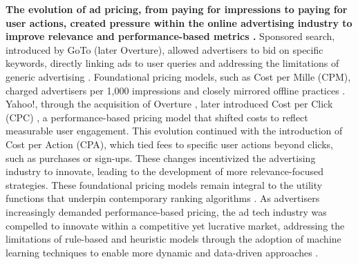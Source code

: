 \documentclass[final]{anthology-ch}         %
\begin{document}
\textbf{The evolution of ad pricing, from paying for impressions to paying for user actions, created pressure within the online advertising industry to improve relevance and performance-based metrics \cite{hu2004performance}.} Sponsored search, introduced by GoTo (later Overture), allowed advertisers to bid on specific keywords, directly linking ads to user queries and addressing the limitations of generic advertising  \cite{fain2006sponsored}. Foundational pricing models, such as Cost per Mille (CPM), charged advertisers per 1,000 impressions and closely mirrored offline practices \cite{wikipedia-cpm}. Yahoo!, through the acquisition of Overture \cite{wsj2003yahoooverture}, later introduced Cost per Click (CPC) \cite{ellam2003overture}, a performance-based pricing model that shifted costs to reflect measurable user engagement. This evolution continued with the introduction of Cost per Action (CPA), which tied fees to specific user actions beyond clicks, such as purchases or sign-ups. These changes incentivized the advertising industry to innovate, leading to the development of more relevance-focused strategies. These foundational pricing models remain integral to the utility functions that underpin contemporary ranking algorithms \cite{fain2006sponsored}. As advertisers increasingly demanded performance-based pricing, the ad tech industry was compelled to innovate within a competitive yet lucrative market, addressing the limitations of rule-based and heuristic models through the adoption of machine learning techniques to enable more dynamic and data-driven approaches \cite{zhang2018whole}.
\end{document}
